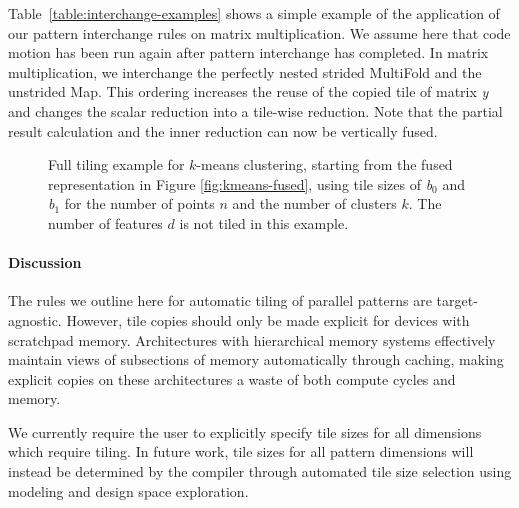 Table~\ref{table:interchange-examples} shows a simple example of the application of our pattern interchange rules on matrix multiplication.
We assume here that code motion has been run again after pattern interchange has completed.
In matrix multiplication, we interchange the perfectly nested strided MultiFold and the unstrided Map.
This ordering increases the reuse of the copied tile of matrix \emph{y} and changes the scalar reduction into a tile-wise reduction.
Note that the partial result calculation and the inner reduction can now be vertically fused.



\begin{figure*}\small\centering

\caption{Full tiling example for $k$-means clustering, starting from the fused representation in Figure \ref{fig:kmeans-fused}, using tile sizes of \emph{b$_0$} and \emph{b$_1$} for the number of points $n$ and the number of clusters $k$. The number of features $d$ is not tiled in this example.}
\label{fig:kmeans-example}
\end{figure*}


\paragraph{Discussion}
The rules we outline here for automatic tiling of parallel patterns are target-agnostic. However, tile copies should only be made explicit
for devices with scratchpad memory. Architectures with hierarchical memory systems effectively maintain views of subsections of memory
automatically through caching, making explicit copies on these architectures a waste of both compute cycles and memory.

We currently require the user to explicitly specify tile sizes for all dimensions which require tiling. In future work, tile sizes for all pattern
dimensions will instead be determined by the compiler through automated tile size selection using modeling and design space exploration.

